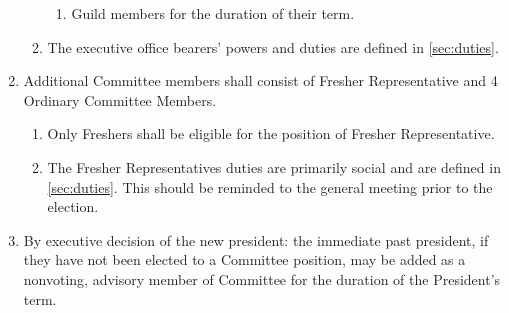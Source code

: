 \documentclass[a4paper]{article}
\begin{document}
\begin{enumerate}
\begin{enumerate}
\begin{enumerate}
                        \item Guild members for the duration of their term.
                    \end{enumerate}
              \item The executive office bearers' powers and duties are defined in \cref{sec:duties}.
          \end{enumerate}
    \item \label{todo_Additional_commitee_members} Additional Committee members shall consist of Fresher Representative and 4 Ordinary Committee Members.
          \begin{enumerate}
              \item \label{todo_Fresher_Rep_Must_Fresher} Only Freshers shall be eligible for the position of Fresher Representative.
              \item The Fresher Representatives duties are primarily social and are defined in \cref{sec:duties}. This should be reminded to the general meeting prior to the election.
          \end{enumerate}
    \item \label{todo_enu_IPP} By executive decision of the new president: the immediate past president, if they have not been elected to a Committee position, may be added as a nonvoting, advisory member of Committee for the duration of the President's term.
\end{enumerate}
\end{document}
